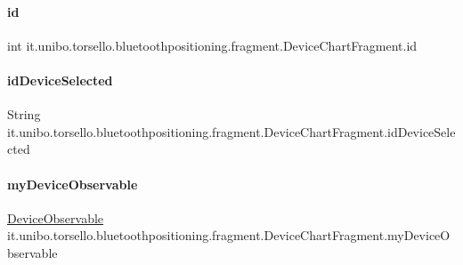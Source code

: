 \paragraph{\texorpdfstring{id}{id}}
{\footnotesize\ttfamily int it.\+unibo.\+torsello.\+bluetoothpositioning.\+fragment.\+Device\+Chart\+Fragment.\+id\hspace{0.3cm}{\ttfamily [private]}}

\hypertarget{classit_1_1unibo_1_1torsello_1_1bluetoothpositioning_1_1fragment_1_1DeviceChartFragment_a5140a40f33827bd14ea68efe8157ee06_a5140a40f33827bd14ea68efe8157ee06}{}\label{classit_1_1unibo_1_1torsello_1_1bluetoothpositioning_1_1fragment_1_1DeviceChartFragment_a5140a40f33827bd14ea68efe8157ee06_a5140a40f33827bd14ea68efe8157ee06} 
\paragraph{\texorpdfstring{id\+Device\+Selected}{idDeviceSelected}}
{\footnotesize\ttfamily String it.\+unibo.\+torsello.\+bluetoothpositioning.\+fragment.\+Device\+Chart\+Fragment.\+id\+Device\+Selected\hspace{0.3cm}{\ttfamily [private]}}

\hypertarget{classit_1_1unibo_1_1torsello_1_1bluetoothpositioning_1_1fragment_1_1DeviceChartFragment_a82756c59ac344db249e6cebcec3d1835_a82756c59ac344db249e6cebcec3d1835}{}\label{classit_1_1unibo_1_1torsello_1_1bluetoothpositioning_1_1fragment_1_1DeviceChartFragment_a82756c59ac344db249e6cebcec3d1835_a82756c59ac344db249e6cebcec3d1835} 
\paragraph{\texorpdfstring{my\+Device\+Observable}{myDeviceObservable}}
{\footnotesize\ttfamily \hyperlink{classit_1_1unibo_1_1torsello_1_1bluetoothpositioning_1_1observables_1_1DeviceObservable}{Device\+Observable} it.\+unibo.\+torsello.\+bluetoothpositioning.\+fragment.\+Device\+Chart\+Fragment.\+my\+Device\+Observable\hspace{0.3cm}{\ttfamily [private]}}


